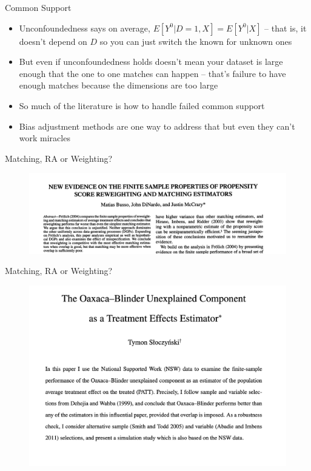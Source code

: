 \documentclass{beamer}
\begin{document}
\begin{frame}{Common Support}

\begin{itemize}
\item Unconfoundedness says on average, $E[Y^0|D=1,X]=E[Y^0|X]$ -- that is, it doesn't depend on $D$ so you can just switch the known for unknown ones
\item But even if unconfoundedness holds doesn't mean your dataset is large enough that the one to one matches can happen -- that's failure to have enough matches because the dimensions are too large
\item So much of the literature is how to handle failed common support
\item Bias adjustment methods are one way to address that but even they can't work miracles
\end{itemize}

\end{frame}


\begin{frame}{Matching, RA or Weighting?}


  \begin{figure}
    \includegraphics[scale=0.2]{./lecture_includes/dinardo_restat}
  \end{figure}


\end{frame}

\begin{frame}{Matching, RA or Weighting?}


  \begin{figure}
    \includegraphics[scale=0.3]{./lecture_includes/tymon_ra}
  \end{figure}


\end{frame}
\end{document}
